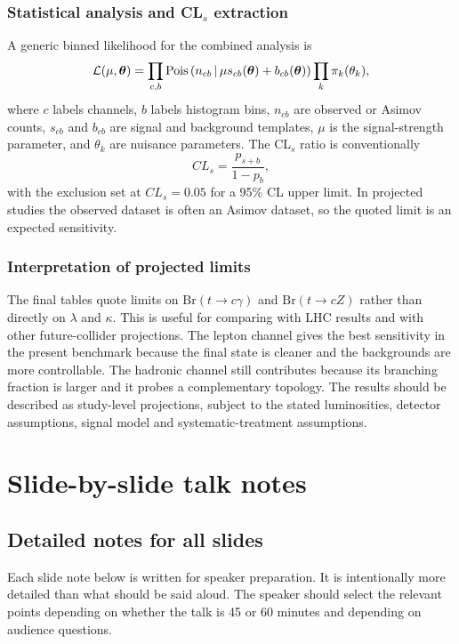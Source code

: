 \documentclass[11pt,a4paper]{report}
\newcommand{\br}{\mathrm{Br}}
\begin{document}
\section{Statistical analysis and CL$_s$ extraction}
A generic binned likelihood for the combined analysis is
\begin{equation}
  \mathcal L(\mu,\boldsymbol\theta)=\prod_{c,b}{\rm Pois}\left(n_{cb}\,\middle|\,\mu s_{cb}(\boldsymbol\theta)+b_{cb}(\boldsymbol\theta)\right)
  \prod_k\pi_k(\theta_k),
\end{equation}
where $c$ labels channels, $b$ labels histogram bins, $n_{cb}$ are observed or Asimov counts, $s_{cb}$ and $b_{cb}$ are signal and background templates, $\mu$ is the signal-strength parameter, and $\theta_k$ are nuisance parameters.  The CL$_s$ ratio is conventionally
\begin{equation}
  CL_s=\frac{p_{s+b}}{1-p_b},
\end{equation}
with the exclusion set at $CL_s=0.05$ for a 95\% CL upper limit.  In projected studies the observed dataset is often an Asimov dataset, so the quoted limit is an expected sensitivity.

\section{Interpretation of projected limits}
The final tables quote limits on $\br(t\to c\gamma)$ and $\br(t\to cZ)$ rather than directly on $\lambda$ and $\kappa$.  This is useful for comparing with LHC results and with other future-collider projections.  The lepton channel gives the best sensitivity in the present benchmark because the final state is cleaner and the backgrounds are more controllable.  The hadronic channel still contributes because its branching fraction is larger and it probes a complementary topology.  The results should be described as study-level projections, subject to the stated luminosities, detector assumptions, signal model and systematic-treatment assumptions.

\part{Slide-by-slide talk notes}
\chapter{Detailed notes for all slides}
\begin{talknotebox}
Each slide note below is written for speaker preparation.  It is intentionally more detailed than what should be said aloud.  The speaker should select the relevant points depending on whether the talk is 45 or 60 minutes and depending on audience questions.
\end{talknotebox}
\end{document}
